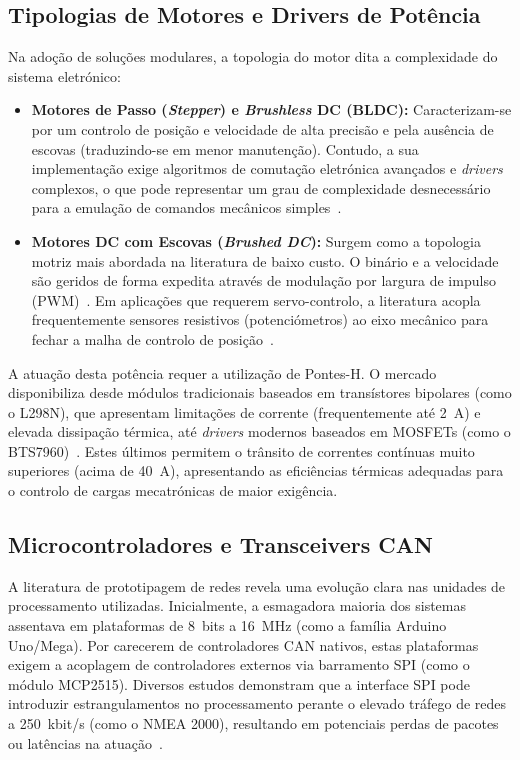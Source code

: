 \subsection{Tipologias de Motores e Drivers de Potência}
Na adoção de soluções modulares, a topologia do motor dita a complexidade do sistema eletrónico:
\begin{itemize}
    \item \textbf{Motores de Passo (\textit{Stepper}) e \textit{Brushless} DC (BLDC):} Caracterizam-se por um controlo de posição e velocidade de alta precisão e pela ausência de escovas (traduzindo-se em menor manutenção). Contudo, a sua implementação exige algoritmos de comutação eletrónica avançados e \textit{drivers} complexos, o que pode representar um grau de complexidade desnecessário para a emulação de comandos mecânicos simples~\cite{hughes2019electric}.
    \item \textbf{Motores DC com Escovas (\textit{Brushed DC}):} Surgem como a topologia motriz mais abordada na literatura de baixo custo. O binário e a velocidade são geridos de forma expedita através de modulação por largura de impulso (PWM)~\cite{hughes2019electric}. Em aplicações que requerem servo-controlo, a literatura acopla frequentemente sensores resistivos (potenciómetros) ao eixo mecânico para fechar a malha de controlo de posição~\cite{ertogan2018marine}.
\end{itemize}

A atuação desta potência requer a utilização de Pontes-H. O mercado disponibiliza desde módulos tradicionais baseados em transístores bipolares (como o L298N), que apresentam limitações de corrente (frequentemente até 2~A) e elevada dissipação térmica, até \textit{drivers} modernos baseados em MOSFETs (como o BTS7960)~\cite{infineon_bts7960}. Estes últimos permitem o trânsito de correntes contínuas muito superiores (acima de 40~A), apresentando as eficiências térmicas adequadas para o controlo de cargas mecatrónicas de maior exigência.

\subsection{Microcontroladores e Transceivers CAN}
A literatura de prototipagem de redes revela uma evolução clara nas unidades de processamento utilizadas. Inicialmente, a esmagadora maioria dos sistemas assentava em plataformas de 8~bits a 16~MHz (como a família Arduino Uno/Mega). Por carecerem de controladores CAN nativos, estas plataformas exigem a acoplagem de controladores externos via barramento SPI (como o módulo MCP2515). Diversos estudos demonstram que a interface SPI pode introduzir estrangulamentos no processamento perante o elevado tráfego de redes a 250~kbit/s (como o NMEA 2000), resultando em potenciais perdas de pacotes ou latências na atuação~\cite{park2011design}.

